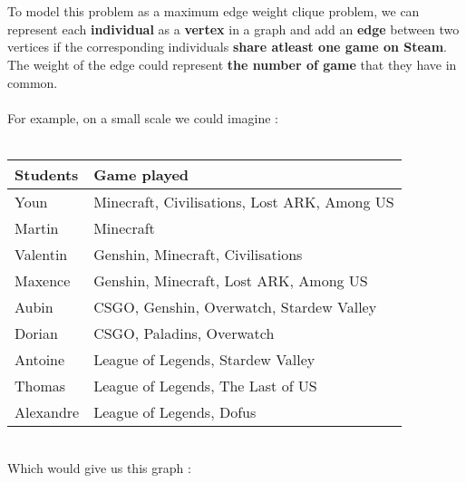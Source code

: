    \\ \\
    To model this problem as a maximum edge weight clique problem, we can represent each \textbf{individual} as a \textbf{vertex} in a graph and add an \textbf{edge} between two vertices if the corresponding individuals \textbf{share atleast one game on Steam}. The weight of the edge could represent \textbf{the number of game} that they have in common.
    \\ \\
    For example, on a small scale we could imagine :
    \\ \\
    \begin{tabular}{|p{10em}|p{35em}|}
        \hline
        \textbf{Students} & \textbf{Game played} \\
        \hline
        Youn & Minecraft, Civilisations, Lost ARK, Among US \\
        \hline
        Martin & Minecraft \\
        \hline
        Valentin & Genshin, Minecraft, Civilisations \\
        \hline
        Maxence & Genshin, Minecraft, Lost ARK, Among US \\
        \hline
        Aubin & CSGO, Genshin, Overwatch, Stardew Valley\\
        \hline
        Dorian & CSGO, Paladins, Overwatch \\
        \hline
        Antoine & League of Legends, Stardew Valley \\
        \hline
        Thomas & League of Legends, The Last of US \\
        \hline
        Alexandre & League of Legends, Dofus \\
        \hline
    \end{tabular}
    \vspace{1\baselineskip} \\
    Which would give us this graph :

    \begin{center}
    \end{center}
    
